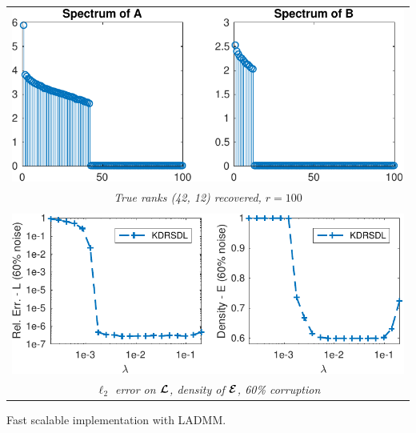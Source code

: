 \documentclass[landscape,a1paper,fontscale=0.42]{baposter}
\begin{document}
\begin{poster}
{    \hfill \begin{tabular}{c}
    \includegraphics[width=.95\linewidth]{Synthetic/kdrsdl_sample_rank}\\
    \textit{True ranks (42, 12) recovered, $r = 100$}\\
    \vspace{0.5em}\\
    \includegraphics[width=.95\linewidth]{Synthetic/synth_60_error_kdrsdl_2}\\
    \textit{$\ell_2$ error on $\bm{\mathcal{L}}$, density of $\bm{\mathcal{E}}$, 60\% corruption}
  \end{tabular} \hfill
    
    Fast scalable implementation with LADMM.



}
\end{poster}
\end{document}
